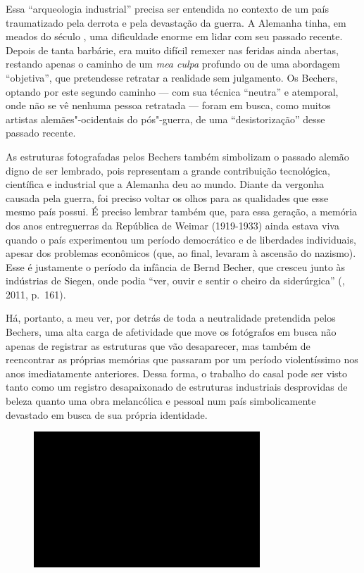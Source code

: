 Essa ``arqueologia industrial'' precisa ser entendida no contexto de um
país traumatizado pela derrota e pela devastação da guerra. A Alemanha
tinha, em meados do século , uma dificuldade enorme em lidar com seu
passado recente. Depois de tanta barbárie, era muito difícil remexer nas
feridas ainda abertas, restando apenas o caminho de um \emph{mea culpa}
profundo ou de uma abordagem ``objetiva'', que pretendesse retratar a
realidade sem julgamento. Os Bechers, optando por este segundo caminho
--- com sua técnica ``neutra'' e atemporal, onde não se vê nenhuma pessoa
retratada --- foram em busca, como muitos artistas alemães"-ocidentais do
pós"-guerra, de uma ``desistorização'' desse passado recente.

As estruturas fotografadas pelos Bechers também simbolizam o passado
alemão digno de ser lembrado, pois representam a grande contribuição
tecnológica, científica e industrial que a Alemanha deu ao mundo. Diante
da vergonha causada pela guerra, foi preciso voltar os olhos para as
qualidades que esse mesmo país possui. É preciso lembrar também que,
para essa geração, a memória dos anos entreguerras da República de
Weimar (1919-1933) ainda estava viva quando o país experimentou um
período democrático e de liberdades individuais, apesar dos problemas
econômicos (que, ao final, levaram à ascensão do nazismo). Esse é
justamente o período da infância de Bernd Becher, que cresceu junto às
indústrias de Siegen, onde podia ``ver, ouvir e sentir o cheiro da
siderúrgica'' (, 2011, p.~161).

Há, portanto, a meu ver, por detrás de toda a neutralidade pretendida
pelos Bechers, uma alta carga de afetividade que move os fotógrafos em busca não apenas de registrar as estruturas que vão desaparecer, mas também de reencontrar as próprias memórias que passaram por um período violentíssimo nos anos imediatamente anteriores. Dessa forma, o trabalho
do casal pode ser visto tanto como um registro desapaixonado de
estruturas industriais desprovidas de beleza quanto uma obra melancólica
e pessoal num país simbolicamente devastado em busca de sua própria
identidade.

\begin{figure}[!ht]

\centering
 \includegraphics[width=85mm]{./imgs/im1.jpg}
\caption{\tiny{}}

\end{figure}

